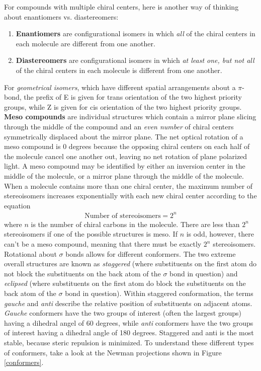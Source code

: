 \documentclass{article}
\theoremstyle{plain}%
\theoremstyle{definition}
\theoremstyle{remark}
\begin{document}
\indent For compounds with multiple chiral centers, here is another way of thinking about enantiomers vs. diastereomers:
\begin{enumerate}
	\item \textbf{Enantiomers} are configurational isomers in which \textit{all} of the chiral centers in each molecule are different from one another.
	\item \textbf{Diastereomers} are configurational isomers in which \textit{at least one, but not all} of the chiral centers in each molecule is different from one another. 
\end{enumerate}
\indent For \textit{geometrical isomers}, which have different spatial arrangements about a $\pi$-bond, the prefix of E is given for trans orientation of the two highest priority groups, while Z is given for cis orientation of the two highest priority groups. \\
\indent \textbf{Meso compounds} are individual structures which contain a mirror plane slicing through the middle of the compound and an \textit{even number} of chiral centers symmetrically displaced about the mirror plane. The net optical rotation of a meso compound is 0 degrees because the opposing chiral centers on each half of the molecule cancel one another out, leaving no net rotation of plane polarized light. A meso compound may be identified by either an inversion center in the middle of the molecule, or a mirror plane through the middle of the molecule.\\
\indent When a molecule contains more than one chiral center, the maximum number of stereoisomers increases exponentially with each new chiral center according to the equation
\begin{equation}
\begin{split}
\text{Number of stereoisomers}=2^n
\end{split}
\end{equation}
\noindent where $n$ is the number of chiral carbons in the molecule. There are less than $2^n$ stereoisomers if one of the possible structures is meso. If $n$ is odd, however, there can't be a meso compound, meaning that there must be exactly $2^n$ stereoisomers.\\
\indent Rotational about $\sigma$ bonds allows for different conformers. The two extreme overall structures are known as \textit{staggered} (where substituents on the first atom do not block the substituents on the back atom of the $\sigma$ bond in question) and \textit{eclipsed} (where substituents on the first atom do block the substituents on the back atom of the $\sigma$ bond in question). Within staggered conformation, the terms \textit{gauche} and \textit{anti} describe the relative position of substituents on adjacent atoms. \textit{Gauche} conformers have the two groups of interest (often the largest groups) having a dihedral angel of 60 degrees, while \textit{anti} conformers have the two groups of interest having a dihedral angle of 180 degrees. Staggered and anti is the most stable, because steric repulsion is minimized. To understand these different types of conformers, take a look at the Newman projections shown in Figure \ref{conformers}.\\
\end{document}
